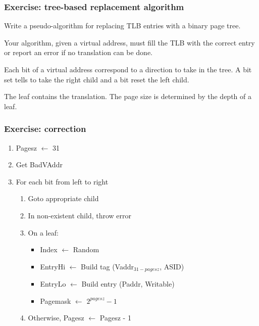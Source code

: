 
\begin{frame}
  \frametitle{Exercise: tree-based replacement algorithm}

  Write a pseudo-algorithm for replacing TLB entries with a binary
  page tree.

  \-

  Your algorithm, given a virtual address, must fill the TLB with the
  correct entry or report an error if no translation can be done.

  \-

  Each bit of a virtual address correspond to a direction to take in
  the tree. A bit set tells to take the right child and a bit reset
  the left child.

  \-

  The leaf contains the translation. The page size is determined by
  the depth of a leaf.

\end{frame}


\begin{frame}
  \frametitle{Exercise: correction}

  \begin{enumerate}
  \item
    Pagesz $\leftarrow$ 31
  \item
    Get BadVAddr
  \item
    For each bit from left to right
    \begin{enumerate}
    \item
      Goto appropriate child
    \item
      In non-existent child, throw error
    \item
      On a leaf:
      \begin{itemize}
      \item
        Index $\leftarrow$ Random
      \item
        EntryHi $\leftarrow$ Build tag (Vaddr$_{31-pagesz}$, ASID)
      \item
        EntryLo $\leftarrow$ Build entry (Paddr, Writable)
      \item
        Pagemask $\leftarrow$ $2^{pagesz}-1$
      \end{itemize}
    \item
      Otherwise, Pagesz $\leftarrow$ Pagesz - 1
    \end{enumerate}
  \end{enumerate}

\end{frame}

